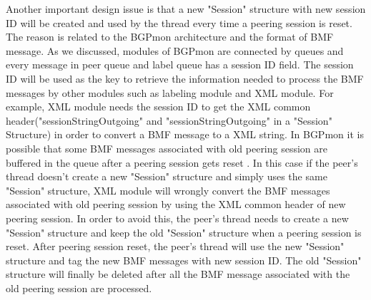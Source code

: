 Another important design issue is that a new "Session" structure with new session ID will be created and used by the thread every time a peering session is reset. The reason is related to the BGPmon architecture and the format of BMF message.
As we discussed, modules of BGPmon are connected by queues and every message in peer queue and label queue has a session ID field. 
The session ID will be used as the key to retrieve the information needed to process the BMF messages by other modules such as labeling module and XML module.
For example, XML module needs the session ID to get the XML common header("sessionStringOutgoing" and "sessionStringOutgoing" in a "Session" Structure) in order to convert a BMF message to a XML string.
In BGPmon it is possible that some BMF messages associated with old peering session are buffered in the queue after a peering session gets reset . 
In this case if the peer's thread doesn't create a new "Session" structure and simply uses the same "Session" structure, XML module will wrongly convert the BMF messages associated with old peering session by using the XML common header of new peering session.
In order to avoid this,  the peer's thread needs to create a new "Session" structure and keep the old "Session" structure when a peering session is reset. After peering session reset, the peer's thread will use the new "Session" structure and tag the new BMF messages with new session ID.
The old "Session" structure will finally be deleted after all the BMF message associated with the old peering session are processed. 



